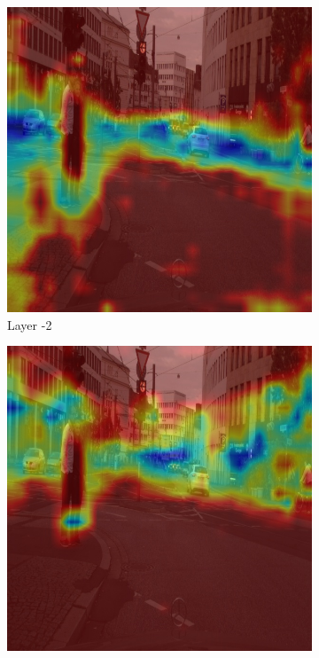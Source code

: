 \begin{figure}[h]
    \centering


    \begin{subfigure}[b]{0.47\textwidth}
        \centering
        \includegraphics[width=\textwidth]{figures/bonn_000035_000019_leftImg8bit.pnglayer-2/bonn_000035_000019_leftImg8bit.png_object(0)_heatmap}
        \caption{Layer -2}
        \label{fig:a-2}
    \end{subfigure}
    \hfill
    \begin{subfigure}[b]{0.47\textwidth}
        \centering
        \includegraphics[width=\textwidth]{figures/bonn_000035_000019_leftImg8bit.pnglayer-3/bonn_000035_000019_leftImg8bit.png_object(0)_heatmap}

\end{subfigure}
\end{figure}
